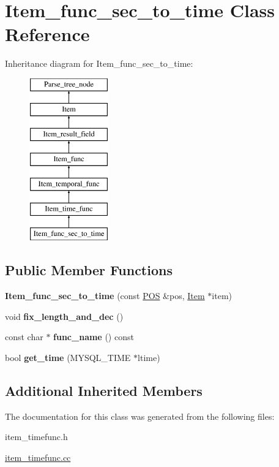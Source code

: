 \hypertarget{classItem__func__sec__to__time}{}\section{Item\+\_\+func\+\_\+sec\+\_\+to\+\_\+time Class Reference}
\label{classItem__func__sec__to__time}
Inheritance diagram for Item\+\_\+func\+\_\+sec\+\_\+to\+\_\+time\+:\begin{figure}[H]
\begin{center}
\leavevmode
\includegraphics[height=7.000000cm]{classItem__func__sec__to__time}
\end{center}
\end{figure}
\subsection*{Public Member Functions}
\begin{DoxyCompactItemize}
\item 
\mbox{\label{classItem__func__sec__to__time_a464959df10eadf5aea315bf08c3380b3}} 
{\bfseries Item\+\_\+func\+\_\+sec\+\_\+to\+\_\+time} (const \mbox{\hyperlink{structYYLTYPE}{P\+OS}} \&pos, \mbox{\hyperlink{classItem}{Item}} $\ast$item)
\item 
\mbox{\label{classItem__func__sec__to__time_abcb61d0c98c7d4cf35512291577be4e6}} 
void {\bfseries fix\+\_\+length\+\_\+and\+\_\+dec} ()
\item 
\mbox{\label{classItem__func__sec__to__time_a983cd01ca03a2219b9e3b1539b8541b1}} 
const char $\ast$ {\bfseries func\+\_\+name} () const
\item 
\mbox{\label{classItem__func__sec__to__time_aec5171a14cd56c230d783f2018303073}} 
bool {\bfseries get\+\_\+time} (M\+Y\+S\+Q\+L\+\_\+\+T\+I\+ME $\ast$ltime)
\end{DoxyCompactItemize}
\subsection*{Additional Inherited Members}


The documentation for this class was generated from the following files\+:\begin{DoxyCompactItemize}
\item 
item\+\_\+timefunc.\+h\item 
\mbox{\hyperlink{item__timefunc_8cc}{item\+\_\+timefunc.\+cc}}\end{DoxyCompactItemize}
